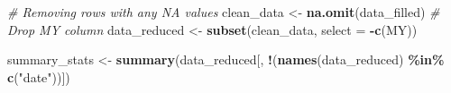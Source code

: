 \documentclass[
]{article}
\newenvironment{Shaded}{\begin{snugshade}}{\end{snugshade}}
\newcommand{\AttributeTok}[1]{\textcolor[rgb]{0.13,0.29,0.53}{#1}}
\newcommand{\CommentTok}[1]{\textcolor[rgb]{0.56,0.35,0.01}{\textit{#1}}}
\newcommand{\FunctionTok}[1]{\textcolor[rgb]{0.13,0.29,0.53}{\textbf{#1}}}
\newcommand{\NormalTok}[1]{#1}
\newcommand{\OtherTok}[1]{\textcolor[rgb]{0.56,0.35,0.01}{#1}}
\newcommand{\SpecialCharTok}[1]{\textcolor[rgb]{0.81,0.36,0.00}{\textbf{#1}}}
\newcommand{\StringTok}[1]{\textcolor[rgb]{0.31,0.60,0.02}{#1}}
\begin{document}
\begin{Shaded}
\begin{Highlighting}[]
\CommentTok{\# Removing rows with any NA values}
\NormalTok{clean\_data }\OtherTok{\textless{}{-}} \FunctionTok{na.omit}\NormalTok{(data\_filled)}
\CommentTok{\# Drop MY column}
\NormalTok{data\_reduced }\OtherTok{\textless{}{-}} \FunctionTok{subset}\NormalTok{(clean\_data, }\AttributeTok{select =} \SpecialCharTok{{-}}\FunctionTok{c}\NormalTok{(MY))}
\end{Highlighting}
\end{Shaded}

\begin{Shaded}
\begin{Highlighting}[]
\NormalTok{summary\_stats }\OtherTok{\textless{}{-}} \FunctionTok{summary}\NormalTok{(data\_reduced[, }\SpecialCharTok{!}\NormalTok{(}\FunctionTok{names}\NormalTok{(data\_reduced) }\SpecialCharTok{\%in\%} \FunctionTok{c}\NormalTok{(}\StringTok{"date"}\NormalTok{))])}
\end{Highlighting}
\end{Shaded}
\end{document}
